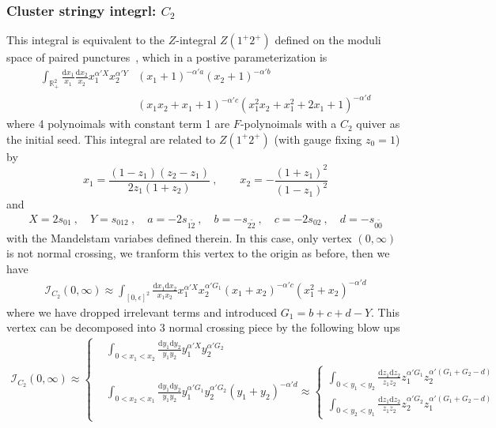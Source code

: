 \documentclass[12pt]{article}
\theoremstyle{definition}
\theoremstyle{plain}
\newcommand{\dif}{\mathrm{d}} %
\begin{document}
\subsubsection*{Cluster stringy integrl: $C_2$}
This integral is equivalent to the $Z$-integral $Z(1^{+}2^{+})$ defined on the moduli space of paired punctures~\cite{}, which in a postive parameterization is 
\begin{align*}
\int_{\mathbb R_+^2} \frac{\dif x_1}{x_1}\frac{\dif x_2}{x_2}x_1^{\alpha' X}x_2^{\alpha' Y}
&(x_1 + 1)^{-\alpha' a} 
(x_2 + 1)^{-\alpha' b}\\
&(x_1x_2 + x_1 + 1)^{-\alpha' c}
(x_1^2x_2 + x_1^2 + 2x_1 + 1)^{-\alpha' d} 
\end{align*}
where 4 polynoimals with constant term 1 are $F$-polynoimals with a $C_{2}$ quiver as the initial seed.
This integral are related to $Z(1^{+}2^{+})$ (with gauge fixing $z_{0}=1$) by 
\begin{equation*}
	x_{1}=\frac{(1-z_{1})(z_{2}-z_{1})}{2z_{1}(1+z_{2})} \:,\qquad x_{2}=-\frac{(1+z_{1})^{2}}{(1-z_{1})^{2}}
\end{equation*}
and
\begin{align*}
	X=2s_{01}\:,\quad Y=s_{012}\:,\quad a=-2s_{1\tilde{2}}\:,\quad b=-s_{2\tilde{2}}\:,\quad 
	c=-2s_{02}\:,\quad d=-s_{0\tilde{0}}
\end{align*}
with the Mandelstam variabes defined therein. In this case, only vertex $(0,\infty)$ is not normal crossing, we tranform this vertex to the origin as before, then we have
\begin{align*}
	\mathcal{I}_{C_{2}}(0,\infty)\approx \int_{[0,\epsilon]^{2}} \frac{\dif x_{1}\dif x_{2}}{x_{1}x_{2}} x_{1}^{\alpha' X}x_{2}^{\alpha' G_{1}}
	(x_{1}+x_{2})^{-\alpha' c} (x_{1}^{2}+x_{2})^{-\alpha' d}
\end{align*}
where we have dropped irrelevant terms and introduced $G_{1}=b+c+d-Y$. This vertex can be decomposed into 3 normal crossing piece by the following blow ups
\begin{align*}
	\mathcal{I}_{C_{2}}(0,\infty)\approx\left\{
	\begin{aligned}
		&\int_{0<x_{1}<x_{2}}\frac{\dif y_{1}\dif y_{2}}{y_{1}y_{2}} y_{1}^{\alpha' X}y_{2}^{\alpha' G_{2}} \\
		&\int_{0<x_{2}<x_{1}}\frac{\dif y_{1}\dif y_{2}}{y_{1}y_{2}} y_{1}^{\alpha' G_{1}}y_{2}^{\alpha' G_{2}}(y_{1}+y_{2})^{-\alpha'd} \approx
		\left\{\begin{aligned}
			\int_{0<y_{1}<y_{2}}\frac{\dif z_{1} \dif z_{2}}{z_{1}z_{2}}z_{1}^{\alpha' G_{1}}
			z_{2}^{\alpha'(G_{1}+G_{2}-d)} \\
			\int_{0<y_{2}<y_{1}}\frac{\dif z_{1}\dif z_{2}}{z_{1}z_{2}} z_{2}^{\alpha' G_{2}}
			z_{1}^{\alpha'(G_{1}+G_{2}-d)}
		\end{aligned} \right. 
	\end{aligned} \right.
\end{align*}
\end{document}
